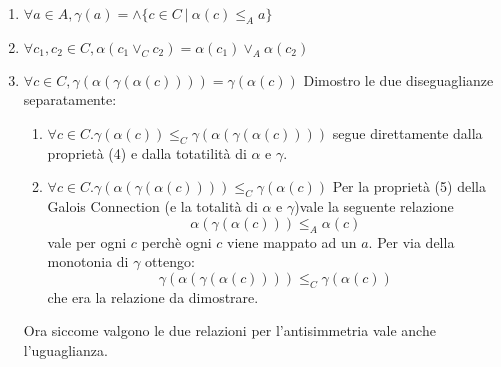 {\begin{enumerate}
\begin{proof}
\begin{enumerate}
		\item
		\label{ex2:item:topC}
		 $\top_C \leq_C \gamma(\alpha(\top_C))$: Segue direttamente dalla proprietà numero (3)
		($\forall c \in C . c \leq_C \gamma(\alpha(c))$) della Galois Connection.
	\end{enumerate}
	visto che valgono le diseguaglianze \ref{ex2:item:gamma:alpha:topC} e \ref{ex2:item:topC}, per l'antisimmetria del poset $(C, \leq_C)$ posso concludere
	$\gamma(\alpha(\top_C)) = \top_C$.
	\end{proof}
	\item $\boxed{\forall a \in A, \gamma(a) = \wedge \{c \in C\ |\ \alpha(c) \leq_A a \}}$
	\item $\boxed{\forall c_1, c_2 \in C, \alpha(c_1 \vee_C c_2) = \alpha(c_1) \vee_A \alpha(c_2)}$
	\item $\boxed{\forall c \in C, \gamma(\alpha(\gamma(\alpha(c)))) = \gamma(\alpha(c))}$
	Dimostro le due diseguaglianze separatamente:
	\begin{enumerate}
		\item $\boxed{\forall c \in C .  \gamma(\alpha(c)) \leq_C \gamma(\alpha(\gamma(\alpha(c))))}$
		segue direttamente dalla proprietà (4) e dalla totatilità di $\alpha$ e $\gamma$.
		\item $\boxed{\forall c \in C . \gamma(\alpha(\gamma(\alpha(c)))) \leq_C \gamma(\alpha(c))}$
		Per la proprietà (5) della Galois Connection (e la totalità di $\alpha$ e $\gamma$)vale la seguente relazione
		$$
		\alpha(\gamma(\alpha(c))) \leq_A \alpha(c) 
		$$
		vale per ogni $c$ perchè ogni $c$ viene mappato ad un $a$.
		Per via della monotonia di $\gamma$ ottengo:
		$$
		\gamma(\alpha(\gamma(\alpha(c)))) \leq_C \gamma(\alpha(c))
		$$
		che era la relazione da dimostrare.
	\end{enumerate}
	Ora siccome valgono le due relazioni per l'antisimmetria vale anche l'uguaglianza.
\end{enumerate}
	
}